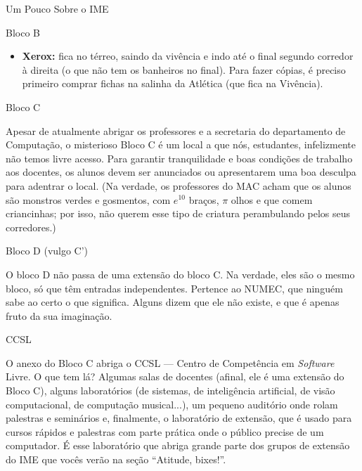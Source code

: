 \begin{secao}{Um Pouco Sobre o IME}
\begin{subsecao}{Bloco B}
\begin{itemize}
\item{\bf Xerox:} fica no térreo, saindo da vivência e indo até o final segundo
  corredor à direita (o que não tem os banheiros no final). Para fazer cópias,
  é preciso primeiro comprar fichas na salinha da Atlética (que fica na Vivência).
\end{itemize}

\end{subsecao}






\begin{subsecao}{Bloco C}

Apesar de atualmente abrigar os professores e a secretaria do departamento de
Computação, o misterioso Bloco C é um local a que nós, estudantes, infelizmente não
temos livre acesso. Para garantir tranquilidade e boas condições de trabalho aos
docentes, os alunos devem ser anunciados ou apresentarem uma boa desculpa para
adentrar o local. (Na verdade, os professores do MAC acham que os alunos são monstros
verdes e gosmentos, com $e^{10}$ braços, $\pi$ olhos e que comem criancinhas;
por isso, não querem esse tipo de criatura perambulando pelos seus corredores.)

\end{subsecao}

\begin{subsecao}{Bloco D (vulgo C')}

O bloco D não passa de uma extensão do bloco C. Na verdade, eles são o mesmo bloco,
só que têm entradas independentes. Pertence ao NUMEC, que ninguém sabe ao certo
o que significa. Alguns dizem que ele não existe, e que é apenas fruto da sua
imaginação.

\end{subsecao}

\begin{subsecao}{CCSL}

O anexo do Bloco C abriga o CCSL --- Centro de Competência em \textit{Software}
Livre. O que tem lá? Algumas salas de docentes (afinal, ele é uma extensão do
Bloco C), alguns laboratórios (de sistemas, de inteligência artificial,
de visão computacional, de computação musical...), um pequeno auditório
onde rolam palestras e seminários e, finalmente, o laboratório de extensão,
que é usado para cursos rápidos e palestras com parte prática onde o público
precise de um computador. É esse laboratório que abriga grande parte dos grupos
de extensão do IME que vocês verão na seção ``Atitude, bixes!''.


\end{subsecao}
\end{secao}
